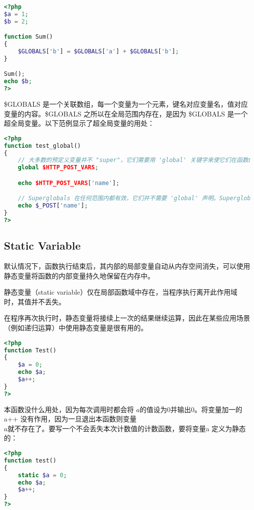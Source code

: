 \begin{lstlisting}[language=PHP]
<?php
$a = 1;
$b = 2;

function Sum()
{
    $GLOBALS['b'] = $GLOBALS['a'] + $GLOBALS['b'];
}

Sum();
echo $b;
?>
\end{lstlisting}

\$GLOBALS 是一个关联数组，每一个变量为一个元素，键名对应变量名，值对应变量的内容。\$GLOBALS 之所以在全局范围内存在，是因为 \$GLOBALS 是一个超全局变量。以下范例显示了超全局变量的用处：


\begin{lstlisting}[language=PHP]
<?php
function test_global()
{
    // 大多数的预定义变量并不 "super"，它们需要用 'global' 关键字来使它们在函数的本地区域中有效。
    global $HTTP_POST_VARS;

    echo $HTTP_POST_VARS['name'];

    // Superglobals 在任何范围内都有效，它们并不需要 'global' 声明。Superglobals 是在 PHP 4.1.0 引入的。
    echo $_POST['name'];
}
?>
\end{lstlisting}

\subsection{Static Variable}


默认情况下，函数执行结束后，其内部的局部变量自动从内存空间消失，可以使用静态变量将函数的内部变量持久地保留在内存中。

静态变量（static variable）仅在局部函数域中存在，当程序执行离开此作用域时，其值并不丢失。

在程序再次执行时，静态变量将接续上一次的结果继续运算，因此在某些应用场景（例如递归运算）中使用静态变量是很有用的。



\begin{lstlisting}[language=PHP]
<?php
function Test()
{
    $a = 0;
    echo $a;
    $a++;
}
?>
\end{lstlisting}

本函数没什么用处，因为每次调用时都会将 $a 的值设为 0 并输出 0。将变量加一的 $a++ 没有作用，因为一旦退出本函数则变量 $a 就不存在了。要写一个不会丢失本次计数值的计数函数，要将变量 $a 定义为静态的：


\begin{lstlisting}[language=PHP]
<?php
function test()
{
    static $a = 0;
    echo $a;
    $a++;
}
?>
\end{lstlisting}

